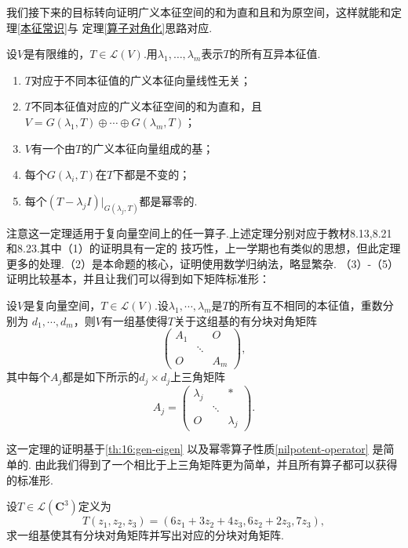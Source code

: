 我们接下来的目标转向证明广义本征空间的和为直和且和为原空间，这样就能和定理\ref{本征常识}与
定理\ref{算子对角化}思路对应.
\begin{theorem}\label{th:16:gen-eigen}
    设$V$是有限维的，$T\in \mathcal{L}(V)$.用$\lambda_1,\ldots,\lambda_m$表示$T$的所有互异本征值.
    \begin{enumerate}
        \item $T$对应于不同本征值的广义本征向量线性无关；

        \item $T$不同本征值对应的广义本征空间的和为直和，且$V=G(\lambda_1,T)\oplus\cdots\oplus
        G(\lambda_m,T)$；

        \item $V$有一个由$T$的广义本征向量组成的基；

        \item 每个$G(\lambda_i,T)$在$T$下都是不变的；

        \item 每个$(T-\lambda_j I)\vert_{G(\lambda_j,T)}$都是幂零的.
    \end{enumerate}
\end{theorem}
注意这一定理适用于复向量空间上的任一算子.上述定理分别对应于教材8.13,8.21和8.23.其中（1）的证明具有一定的
技巧性，上一学期也有类似的思想，但此定理更多的处理.（2）是本命题的核心，证明使用数学归纳法，略显繁杂.
（3）-（5）证明比较基本，并且让我们可以得到如下矩阵标准形：
\begin{theorem}
    设$V$是复向量空间，$T\in \mathcal{L}(V)$.设$\lambda_1,\cdots,\lambda_m$是$T$的所有互不相同的本征值，重数分别为
    $d_1,\cdots,d_m$，则$V$有一组基使得$T$关于这组基的有分块对角矩阵
    $$\begin{pmatrix}
        A_1 &  & O \\  & \ddots &  \\ O &  & A_m
    \end{pmatrix},$$其中每个$A_j$都是如下所示的$d_j\times d_j$上三角矩阵
    $$A_j=\begin{pmatrix}
        \lambda_j &  & * \\  & \ddots &  \\ O &  & \lambda_j
    \end{pmatrix}.$$
\end{theorem}
这一定理的证明基于\autoref{th:16:gen-eigen} 以及幂零算子性质\autoref{nilpotent-operator} 是简单的.
由此我们得到了一个相比于上三角矩阵更为简单，并且所有算子都可以获得的标准形.
\begin{example}
    设$T\in \mathcal{L}(\mathbf{C}^3)$定义为
    \[T(z_1,z_2,z_3)=(6z_1+3z_2+4z_3,6z_2+2z_3,7z_3),\]求一组基使其有分块对角矩阵并写出对应的分块对角矩阵.
\end{example}
